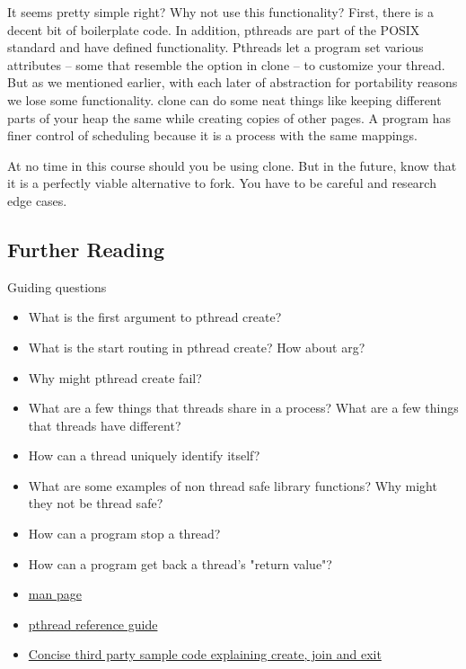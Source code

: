 It seems pretty simple right?
Why not use this functionality?
First, there is a decent bit of boilerplate code.
In addition, pthreads are part of the POSIX standard and have defined functionality.
Pthreads let a program set various attributes -- some that resemble the option in clone -- to customize your thread.
But as we mentioned earlier, with each later of abstraction for portability reasons we lose some functionality.
clone can do some neat things like keeping different parts of your heap the same while creating copies of other pages.
A program has finer control of scheduling because it is a process with the same mappings.

At no time in this course should you be using clone.
But in the future, know that it is a perfectly viable alternative to fork.
You have to be careful and research edge cases.

\subsection{Further Reading}

Guiding questions

\begin{itemize}
\item What is the first argument to pthread create?
\item What is the start routing in pthread create? How about arg?
\item Why might pthread create fail?
\item What are a few things that threads share in a process? What are a few things that threads have different?
\item How can a thread uniquely identify itself?
\item What are some examples of non thread safe library functions? Why might they not be thread safe?
\item How can a program stop a thread?
\item How can a program get back a thread's "return value"?
\end{itemize}

\begin{itemize}
\item \href{http://man7.org/linux/man-pages/man3/pthread_create.3.html}{man page}
\item \href{http://man7.org/linux/man-pages/man7/pthreads.7.html}{pthread reference guide}
\item \href{http://www.thegeekstuff.com/2012/04/terminate-c-thread/}{Concise third party sample code explaining create, join and exit}
\end{itemize}

